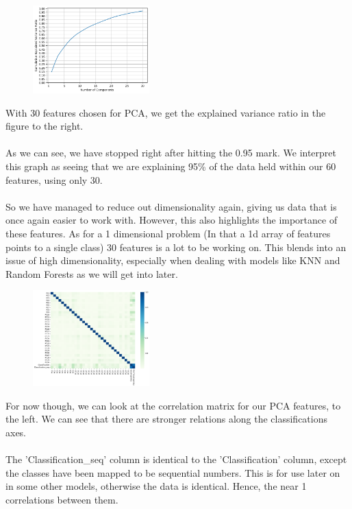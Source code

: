 \documentclass[12pt,a4paper]{article}
\begin{document}
    \begin{figure}
        \centering
        \includegraphics[width=0.4\textwidth]{PCA_variance_ratio}
    \end{figure}

    With 30 features chosen for PCA, we get the explained variance ratio in the figure to
    the right. 
    \\
    \\
    As we can see, we have stopped right after hitting the 0.95 mark. We interpret this graph
    as seeing that we are explaining 95\% of the data held within our 60 features, using only
    30.
    \\
    \\
    So we have managed to reduce out dimensionality again, giving us data that is once again
    easier to work with. However, this also highlights the importance of these features. As
    for a 1 dimensional problem (In that a 1d array of features points to a single class)
    30 features is a lot to be working on. This blends into an issue of high dimensionality,
    especially when dealing with models like KNN and Random Forests as we will get into later.

    \begin{figure}
        \centering
        \includegraphics[width=0.4\textwidth]{pca_heatmap}
    \end{figure}
    
    For now though, we can look at the correlation matrix for our PCA features, to the left.
    We can see that there are stronger relations along the classifications axes.
    \\
    \\
    The 'Classification\_seq' column is identical to the 'Classification' column, except the
    classes have been mapped to be sequential numbers. This is for use later on in some other
    models, otherwise the data is identical. Hence, the near 1 correlations between them.
    \\
    \\
\end{document}
